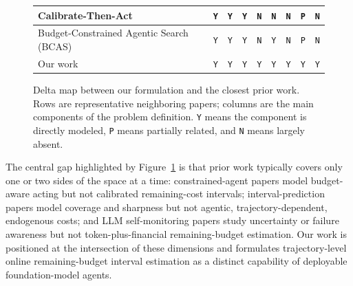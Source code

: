 \begin{figure}[t]
\begin{tabular}{|p{}|c|c|c|c|c|c|c|c|}
\hline
Calibrate-Then-Act~\cite{ding2026calibratethenact} & \texttt{Y} & \texttt{Y} & \texttt{Y} & \texttt{N} & \texttt{N} & \texttt{N} & \texttt{P} & \texttt{N} \\
\hline
Budget-Constrained Agentic Search (BCAS)~\cite{mccleary2026quantifying} & \texttt{Y} & \texttt{Y} & \texttt{Y} & \texttt{N} & \texttt{Y} & \texttt{N} & \texttt{P} & \texttt{N} \\
\hline
Our work & \texttt{Y} & \texttt{Y} & \texttt{Y} & \texttt{Y} & \texttt{Y} & \texttt{Y} & \texttt{Y} & \texttt{Y} \\
\hline
\end{tabular}
\caption{Delta map between our formulation and the closest prior work. Rows are representative neighboring papers; columns are the main components of the problem definition. \texttt{Y} means the component is directly modeled, \texttt{P} means partially related, and \texttt{N} means largely absent.}
\label{fig:related-work-delta-map}
\end{figure}

The central gap highlighted by Figure~\ref{fig:related-work-delta-map} is that prior work typically covers only one or two sides of the space at a time: constrained-agent papers model budget-aware acting but not calibrated remaining-cost intervals; interval-prediction papers model coverage and sharpness but not agentic, trajectory-dependent, endogenous costs; and LLM self-monitoring papers study uncertainty or failure awareness but not token-plus-financial remaining-budget estimation. Our work is positioned at the intersection of these dimensions and formulates trajectory-level online remaining-budget interval estimation as a distinct capability of deployable foundation-model agents.
